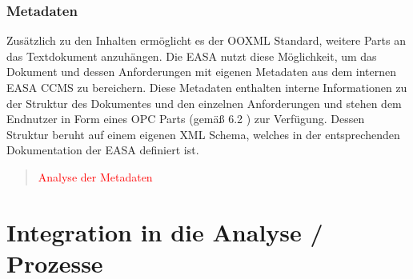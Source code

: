             \pagebreak
            \subsubsection{Metadaten}

            Zusätzlich zu den Inhalten ermöglicht es der \ac{OOXML} Standard, weitere Parts an das Textdokument anzuhängen.
            Die \ac{EASA} nutzt diese Möglichkeit, um das Dokument und dessen Anforderungen mit eigenen Metadaten aus dem internen \ac{EASA} \ac{CCMS} zu bereichern.
            Diese Metadaten enthalten interne Informationen zu der Struktur des Dokumentes und den einzelnen Anforderungen und stehen dem Endnutzer in Form eines \ac{OPC} Parts (gemäß 6.2 \cite{easa_opc_iso}) zur Verfügung.
            Dessen Struktur beruht auf einem eigenen \ac{XML} Schema, welches in der entsprechenden Dokumentation der \ac{EASA} definiert ist.

            

\begin{quote}
\textcolor{red}{Analyse der Metadaten}
\end{quote}
        
    \pagebreak
    \section{Integration in die Analyse / Prozesse}